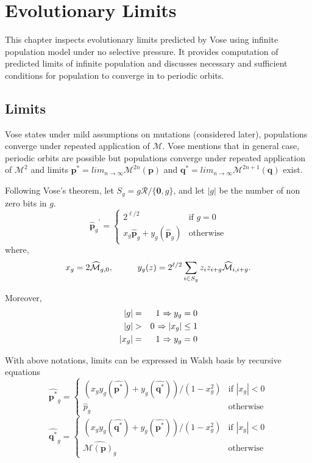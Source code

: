\chapter{Evolutionary Limits} \label{ch:evolutionary limits}
This chapter inspects evolutionary limits predicted by Vose using infinite population model under no selective pressure. 
It provides computation of predicted limits of infinite population and discusses necessary and sufficient conditions for population to converge in to periodic orbits. 

\section{Limits}
\label{Limits}
Vose states under mild assumptions on mutations (considered later), populations converge under repeated application 
of $\mathcal{M}$. Vose mentions that in general case, periodic orbits are possible but populations converge under 
repeated application of $\mathcal{M}^2$ and limits ${\bm p}^\ast = lim_{n \rightarrow \infty} \mathcal{M}^{2n}({\bm p})$ 
and ${\bm q}^\ast = lim_{n \rightarrow \infty} \mathcal{M}^{2n+1}({\bm q})$ exist.

Following Vose's theorem, let $S_g = g \mathcal{R} / \{\textbf{0}, g\}$, and let $|g|$ be the number of non zero bits in $g$.
\[
{{\widehat{{\bm p}}}_g}^{\prime}  = \begin{cases}
    2^{\ell /2}  & \text{if $g = 0$}\\
    x_g \widehat{{\bm p}}_g + y_g(\widehat{{\bm p}}_g) & \text{otherwise}
  \end{cases}
\]
where,
\[
x_g = 2\widehat{\mathcal{M}}_{g,0},  \hspace*{1cm} y_g(z) = 2^{\ell /2} \sum_{i \in S_g} z_i z_{i+g} \widehat{\mathcal{M}}_{i,i+g}.
\]

Moreover, 
\begin{eqnarray*}
|g| & = & 1 \hspace{0.01in} \Rightarrow y_g = 0 \\
|g| & > & 0 \hspace{0.01in} \Rightarrow |x_g| \leq 1 \\
|x_g| & = & 1 \hspace{0.01in} \Rightarrow y_g = 0
\end{eqnarray*}

With above notations, limits can be expressed in Walsh basis by recursive equations 
\begin{equation}
\label{lt1}
\widehat{{\bm p}^{\ast}}_g  = \begin{cases}
    (x_g y_g(\widehat{{\bm p}^{\ast}}) + y_g(\widehat{{\bm q}^{\ast}}))/(1-x_g^2)  & \text{if $|x_g| < 0$}\\
    \widehat{p}_g  & \text{otherwise}
  \end{cases}
\end{equation}
\begin{equation}
\label{lt2}
\widehat{{\bm q}^{\ast}}_g  = \begin{cases}
    (x_g y_g(\widehat{{\bm q}^{\ast}}) + y_g(\widehat{{\bm p}^{\ast}}))/(1-x_g^2)  & \text{if $|x_g| < 0$}\\
    \widehat{\mathcal{M}({\bm p})_g}  & \text{otherwise}
  \end{cases}
\end{equation}

